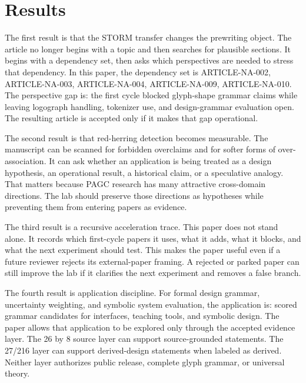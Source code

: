 \documentclass[sigconf,nonacm]{acmart}
\begin{document}
\section{Results}
The first result is that the STORM transfer changes the prewriting object. The
article no longer begins with a topic and then searches for plausible sections.
It begins with a dependency set, then asks which perspectives are needed to
stress that dependency. In this paper, the dependency set is ARTICLE-NA-002, ARTICLE-NA-003, ARTICLE-NA-004, ARTICLE-NA-009, ARTICLE-NA-010. The
perspective gap is: the first cycle blocked glyph-shape grammar claims while leaving logograph handling, tokenizer use, and design-grammar evaluation open. The resulting article is accepted only if it makes
that gap operational.

The second result is that red-herring detection becomes measurable. The
manuscript can be scanned for forbidden overclaims and for softer forms of
over-association. It can ask whether an application is being treated as a design
hypothesis, an operational result, a historical claim, or a speculative analogy.
That matters because PAGC research has many attractive cross-domain directions.
The lab should preserve those directions as hypotheses while preventing them
from entering papers as evidence.

The third result is a recursive acceleration trace. This paper does not stand
alone. It records which first-cycle papers it uses, what it adds, what it blocks,
and what the next experiment should test. This makes the paper useful even if a
future reviewer rejects its external-paper framing. A rejected or parked paper
can still improve the lab if it clarifies the next experiment and removes a
false branch.

The fourth result is application discipline. For formal design grammar, uncertainty weighting, and symbolic system evaluation, the application is:
scored grammar candidates for interfaces, teaching tools, and symbolic design. The paper allows that application to be explored only through the
accepted evidence layer. The 26 by 8 source layer can support source-grounded
statements. The 27/216 layer can support derived-design statements when labeled
as derived. Neither layer authorizes public release, complete glyph grammar, or
universal theory.
\end{document}
